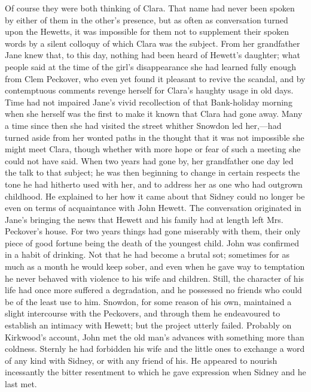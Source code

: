 Of course they were both thinking of Clara. That name had never been
spoken by either of them in the other's presence, but as often as
conversation turned upon the Hewetts, it was impossible for them not to
supplement their spoken words by a silent colloquy of which Clara was
the subject. From her grandfather Jane knew that, to this day, nothing
had been heard of Hewett's daughter; what people said at the time of the
girl's disappearance she had learned fully enough from Clem Peckover,
who even yet found it pleasant to revive the scandal, and by
contemptuous comments revenge herself for Clara's haughty
{\protect\hypertarget{53}{}{}}usage in old days. Time had not impaired
Jane's vivid recollection of that Bank-holiday morning when she herself
was the first to make it known that Clara had gone away. Many a time
since then she had visited the street whither Snowdon led her,---had
turned aside from her wonted paths in the thought that it was not
impossible she might meet Clara, though whether with more hope or fear
of such a meeting she could not have said. When two years had gone by,
her grandfather one day led the talk to that subject; he was then
beginning to change in certain respects the tone he had hitherto used
with her, and to address her as one who had outgrown childhood. He
explained to her how it came about that Sidney could no longer be even
on terms of acquaintance with John Hewett. The conversation originated
in Jane's bringing the news that Hewett and his family had at length
left Mrs. Peckover's house. For two years things had gone miserably with
them, their only piece of good fortune being the death of the youngest
child. John was confirmed in a {\protect\hypertarget{54}{}{}}habit of
drinking. Not that he had become a brutal sot; sometimes for as much as
a month he would keep sober, and even when he gave way to temptation he
never behaved with violence to his wife and children. Still, the
character of his life had once more suffered a degradation, and he
possessed no friends who could be of the least use to him. Snowdon, for
some reason of his own, maintained a slight intercourse with the
Peckovers, and through them he endeavoured to establish an intimacy with
Hewett; but the project utterly failed. Probably on Kirkwood's account,
John met the old man's advances with something more than coldness.
Sternly he had forbidden his wife and the little ones to exchange a word
of any kind with Sidney, or with any friend of his. He appeared to
nourish incessantly the bitter resentment to which he gave expression
when Sidney and he last met.

